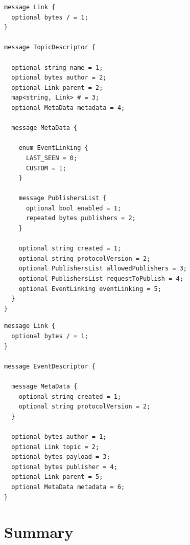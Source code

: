 \begin{lstlisting}[float, language=protobuf3,caption={Protobuf schema of the topic descriptor},label={proto-topic-descriptor}]
message Link {
  optional bytes / = 1;
}

message TopicDescriptor {

  optional string name = 1;
  optional bytes author = 2;
  optional Link parent = 2;
  map<string, Link> # = 3;
  optional MetaData metadata = 4;

  message MetaData {

    enum EventLinking {
      LAST_SEEN = 0;
      CUSTOM = 1;
    }

    message PublishersList {
      optional bool enabled = 1;
      repeated bytes publishers = 2;
    }

    optional string created = 1;
    optional string protocolVersion = 2;
    optional PublishersList allowedPublishers = 3;
    optional PublishersList requestToPublish = 4;
    optional EventLinking eventLinking = 5;
  }
}
\end{lstlisting}

\begin{lstlisting}[float, language=protobuf3,caption={Protobuf schema of the event descriptor},label={proto-event-descriptor}]
message Link {
  optional bytes / = 1;
}

message EventDescriptor {

  message MetaData {
    optional string created = 1;
    optional string protocolVersion = 2;
  }

  optional bytes author = 1;
  optional Link topic = 2;
  optional bytes payload = 3;
  optional bytes publisher = 4;
  optional Link parent = 5;
  optional MetaData metadata = 6;
}
\end{lstlisting}

\section{Summary}\label{summary}

